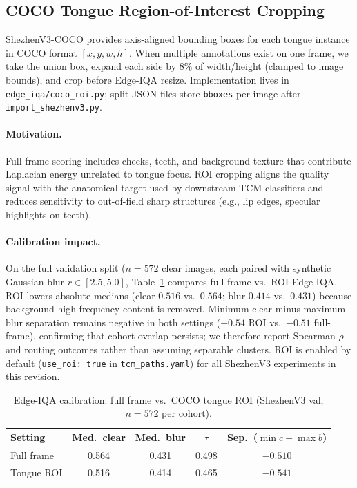 \subsection{COCO Tongue Region-of-Interest Cropping}
\label{sec:roi}

ShezhenV3-COCO provides axis-aligned bounding boxes for each tongue instance in COCO format $[x,y,w,h]$.
When multiple annotations exist on one frame, we take the union box, expand each side by $8\%$ of width/height (clamped to image bounds), and crop before Edge-IQA resize.
Implementation lives in \texttt{edge\_iqa/coco\_roi.py}; split JSON files store \texttt{bboxes} per image after \texttt{import\_shezhenv3.py}.

\paragraph{Motivation.}
Full-frame scoring includes cheeks, teeth, and background texture that contribute Laplacian energy unrelated to tongue focus.
ROI cropping aligns the quality signal with the anatomical target used by downstream TCM classifiers and reduces sensitivity to out-of-field sharp structures (e.g., lip edges, specular highlights on teeth).

\paragraph{Calibration impact.}
On the full validation split ($n{=}572$ clear images, each paired with synthetic Gaussian blur $r{\in}[2.5,5.0]$, Table~\ref{tab:roi-ablation} compares full-frame vs.\ ROI Edge-IQA.
ROI lowers absolute medians (clear $0.516$ vs.\ $0.564$; blur $0.414$ vs.\ $0.431$) because background high-frequency content is removed.
Minimum-clear minus maximum-blur separation remains negative in both settings ($-0.54$ ROI vs.\ $-0.51$ full-frame), confirming that cohort overlap persists; we therefore report Spearman $\rho$ and routing outcomes rather than assuming separable clusters.
ROI is enabled by default (\texttt{use\_roi: true} in \texttt{tcm\_paths.yaml}) for all ShezhenV3 experiments in this revision.

\begin{table}[t]
\centering
\caption{Edge-IQA calibration: full frame vs.\ COCO tongue ROI (ShezhenV3 val, $n{=}572$ per cohort).}
\label{tab:roi-ablation}
\small
\begin{tabular}{lcccc}
\hline
Setting & Med.\ clear & Med.\ blur & $\tau$ & Sep.\ ($\min c{-}\max b$) \\
\hline
Full frame & 0.564 & 0.431 & 0.498 & $-0.510$ \\
Tongue ROI & 0.516 & 0.414 & 0.465 & $-0.541$ \\
\hline
\end{tabular}
\end{table}

